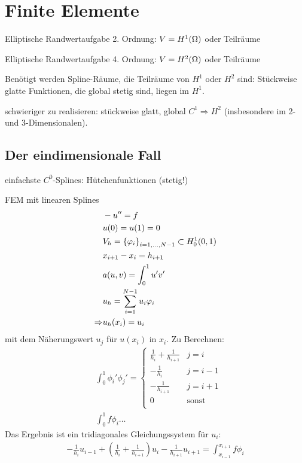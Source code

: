 \section{Finite Elemente}

Elliptische Randwertaufgabe 2. Ordnung: $  V = H^1(\Omega)$ oder Teilräume

Elliptische Randwertaufgabe 4. Ordnung: $  V = H^2(\Omega)$ oder Teilräume

Benötigt werden Spline-Räume, die Teilräume von $H^1$ oder $H^2$ sind: Stückweise glatte Funktionen, die global stetig sind, liegen im $H^1$.

schwieriger zu realisieren: stückweise glatt, global $C^1 \Rightarrow H^2$ (insbesondere im 2- und 3-Dimensionalen).
\subsection{Der eindimensionale Fall}
 einfachste $C^0$-Splines: Hütchenfunktionen (stetig!)

 \begin{beispiel}
   FEM mit linearen Splines
   \begin{align*}
&     -u'' = f\\
&u(0) = u(1) = 0\\
&V_h = \left\{ \varphi_i \right\}_{i = 1, \dots, N-1} \subset H_0^1(0,1)\\
&x_{i+1}-x_i= h_{i+1}\\
& a(u,v) = \int_0^1 u'v'\\
&u_h= \sum_{i = 1}^{N-1}u_i\varphi_i\\
\Rightarrow & u_h(x_i) = u_i
   \end{align*}
mit dem Näherungswert $u_j$ für $u(x_i)$ in $x_i$.
Zu Berechnen:
\begin{align*}
 & \int_0^1\phi_i'\phi_j' =
  \begin{cases}
    \frac 1{h_i}+ \frac 1{h_{i+1}}& j = i\\
    -\frac 1{h_i} & j = i-1\\
    -\frac 1{h_{i+1}} & j = i+1\\
    0 & \text{sonst}\\
  \end{cases}
\\
&  \int_0^1f \phi_i \dots
\end{align*}
Das Ergebnis ist ein tridiagonales Gleichungssystem für $u_i$:
\begin{align*}
  -\frac 1{h_i} u_{i-1}+ \left(\frac 1{h_i}+ \frac 1 {h_{i+1}}\right)u_i - \frac 1{h_{i+1}}u_{i+1} = \int_{x_{i-1}}^{x_{i+1}}f \phi_i
\end{align*}
 \end{beispiel}

